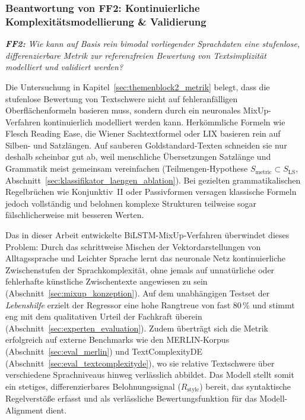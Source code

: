 \subsubsection{Beantwortung von FF2: Kontinuierliche Komplexitätsmodellierung \& Validierung}

\begin{tcolorbox}[boxrule=0pt,sharp corners,enhanced,borderline west={2pt}{0pt}{blue}]
    \textit{\textbf{FF2:} Wie kann auf Basis rein bimodal vorliegender Sprachdaten eine stufenlose, differenzierbare Metrik zur referenzfreien Bewertung von Textsimplizität modelliert und validiert werden?}
\end{tcolorbox}

Die Untersuchung in Kapitel~\ref{sec:themenblock2_metrik} belegt, dass die stufenlose Bewertung von Textschwere nicht auf fehleranfälligen Oberflächenformeln basieren muss, sondern durch ein neuronales MixUp-Verfahren kontinuierlich modelliert werden kann. Herkömmliche Formeln wie Flesch Reading Ease, die Wiener Sachtextformel oder LIX basieren rein auf Silben- und Satzlängen. Auf sauberen Goldstandard-Texten schneiden sie nur deshalb scheinbar gut ab, weil menschliche Übersetzungen Satzlänge und Grammatik meist gemeinsam vereinfachen (Teilmengen-Hypothese $S_{\text{metric}} \subset S_{\text{LS}}$, Abschnitt~\ref{sec:klassifikator_laengen_ablation}). Bei gezielten grammatikalischen Regelbrüchen wie Konjunktiv~II oder Passivformen versagen klassische Formeln jedoch vollständig und belohnen komplexe Strukturen teilweise sogar fälschlicherweise mit besseren Werten.

Das in dieser Arbeit entwickelte BiLSTM-MixUp-Verfahren überwindet dieses Problem: Durch das schrittweise Mischen der Vektordarstellungen von Alltagssprache und Leichter Sprache lernt das neuronale Netz kontinuierliche Zwischenstufen der Sprachkomplexität, ohne jemals auf unnatürliche oder fehlerhafte künstliche Zwischentexte angewiesen zu sein (Abschnitt~\ref{sec:mixup_konzeption}). Auf dem unabhängigen Testset der \textit{Lebenshilfe} erzielt der Regressor eine hohe Rangtreue von fast $80\,\%$ und stimmt eng mit dem qualitativen Urteil der Fachkraft überein (Abschnitt~\ref{sec:experten_evaluation}). Zudem überträgt sich die Metrik erfolgreich auf externe Benchmarks wie den MERLIN-Korpus (Abschnitt~\ref{sec:eval_merlin}) und TextComplexityDE (Abschnitt~\ref{sec:eval_textcomplexityde}), wo sie relative Textschwere über verschiedene Sprachniveaus hinweg verlässlich abbildet. Das Modell stellt somit ein stetiges, differenzierbares Belohnungssignal ($R_{\text{style}}$) bereit, das syntaktische Regelverstöße erfasst und als verlässliche Bewertungsfunktion für das Modell-Alignment dient.

